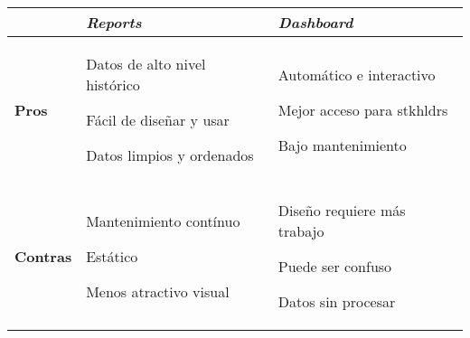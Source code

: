 \begin{table}
    \centering
    \begin{tabular}{|p{1.8cm}|p{5.9cm}|p{5.9cm}|}
        \hline
        & \textbf{\textit{Reports}} & \textbf{\textit{Dashboard}} \\
        \hline
        \textbf{Pros} & \begin{description}
            \item {Datos de alto nivel histórico}
            \item {Fácil de diseñar y usar}
            \item {Datos limpios y ordenados}
        \end{description} & \begin{description}
            \item {Automático e interactivo}
            \item {Mejor acceso para \Gls{stkhldrs}}
            \item {Bajo mantenimiento}
        \end{description} \\
        \hline
        \textbf{Contras} & \begin{description}
            \item {Mantenimiento contínuo}
            \item {Estático}
            \item {Menos atractivo visual}
        \end{description} & \begin{description}
            \item {Diseño requiere más trabajo}
            \item {Puede ser confuso}
            \item {Datos sin procesar}
        \end{description} \\
        \hline
    \end{tabular}
\end{table}

\newpage